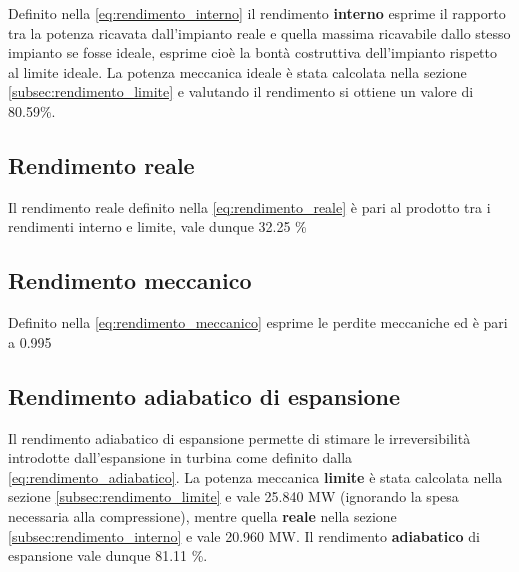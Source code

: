 \documentclass[a4paper,12pt]{article}
\begin{document}
Definito nella \eqref{eq:rendimento_interno} il rendimento \textbf{interno} esprime il rapporto tra la potenza ricavata dall'impianto reale
e quella massima ricavabile dallo stesso impianto se fosse ideale, esprime cioè la bontà costruttiva dell'impianto rispetto al limite ideale.
La potenza meccanica ideale è stata calcolata nella sezione \ref{subsec:rendimento_limite} e valutando il rendimento si ottiene un valore di 
80.59\%.

\subsection{Rendimento reale}
Il rendimento reale definito nella \eqref{eq:rendimento_reale} è pari al prodotto tra i rendimenti interno e limite, vale dunque 32.25 \%

\subsection{Rendimento meccanico}
Definito nella \eqref{eq:rendimento_meccanico} esprime le perdite meccaniche ed è pari a 0.995

\subsection{Rendimento adiabatico di espansione}
Il rendimento adiabatico di espansione permette di stimare le irreversibilità introdotte dall'espansione in turbina come definito dalla \eqref{eq:rendimento_adiabatico}.
La potenza meccanica \textbf{limite} è stata calcolata nella sezione \ref{subsec:rendimento_limite} e vale 25.840 MW (ignorando la spesa necessaria alla compressione),
mentre quella \textbf{reale} nella sezione \ref{subsec:rendimento_interno} e vale 20.960 MW.
Il rendimento \textbf{adiabatico} di espansione vale dunque 81.11 \%.
\end{document}
